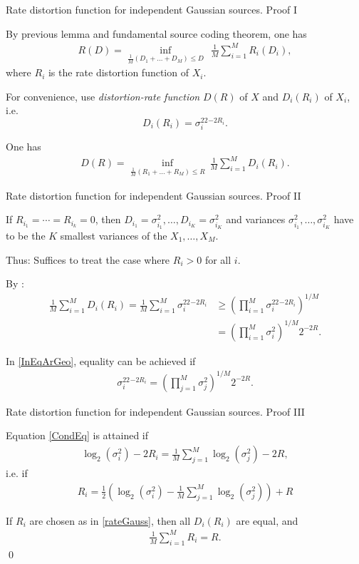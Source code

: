 \begin{frame}{Rate distortion function for independent Gaussian sources. Proof I}
\bit
\item By previous lemma and fundamental source coding theorem, one has
\begin{align*}
R(D)=\inf_{\frac{1}{M}(D_1+\dots+D_M)\leq D}\:\:\frac{1}{M}\sum_{i=1}^MR_i(D_i),
\end{align*}
where $R_i$ is the rate distortion function of $X_i$. 
\item For convenience, use \textit{distortion-rate function} $D(R)$ of $X$ and $D_i(R_i)$ of $X_i$, i.e. 
\[
D_i(R_i)=\sigma_i^22^{-2R_i}. 
\]
\item One has 
\begin{align*}
D(R)=\inf_{\frac{1}{M}(R_1+\dots+R_M)\leq R}\:\frac{1}{M}\sum_{i=1}^MD_i(R_i). 
\end{align*}
\eit
\end{frame}

\begin{frame}{Rate distortion function for independent Gaussian sources. Proof II}
\bit
\item If $R_{i_1}=\cdots=R_{i_k}=0$, then
$D_{i_1}=\sigma_{i_1}^2,\dots, D_{i_K}=\sigma_{i_K}^2$ and
variances $\sigma_{i_1}^2,\dots,\sigma_{i_K}^2$ have to be the $K$ smallest variances of the $X_1,\dots,X_M$.
\item Thus: Suffices to treat the case where $R_i>0$ for all $i$. 
\item By :  
\begin{align}\label{InEqArGeo}
\frac{1}{M}\sum_{i=1}^MD_i(R_i) =  \frac{1}{M} \sum_{i=1}	^M\sigma_i^22^{-2R_i} 
&\geq (\prod_{i=1}^M\sigma_i^22^{-2R_i})^{1/M}\nonumber
\\&=(\prod_{i=1}^M\sigma_i^2)^{1/M}2^{-2R}.
\end{align}
\item In \eqref{InEqArGeo}, equality can be achieved if  
\begin{align}\label{CondEq}
\sigma_i^22^{-2R_i}=(\prod_{j=1}^M\sigma_j^2)^{1/M}2^{-2R}.
\end{align}
\eit
\end{frame}

\begin{frame}{Rate distortion function for independent Gaussian sources. Proof III}
\bit
\item Equation \eqref{CondEq} is attained if 
\begin{align*}
\log_2(\sigma_i^2)-2R_i=\frac{1}{M}\sum_{j=1}^M\log_2(\sigma_j^2)-2R,
\end{align*}
i.e. if 
\begin{align}\label{rateGauss}
R_i=\frac{1}{2}\left(\log_2(\sigma_i^2)-\frac{1}{M}\sum_{j=1}^M\log_2(\sigma_j^2)\right)+R
\end{align}
\item If $R_i$ are chosen as in \eqref{rateGauss}, then all $D_i(R_i)$ are equal, and 
\begin{align*}
\frac{1}{M}\sum_{i=1}^MR_i=R.
\end{align*}
 \qed
\eit
\end{frame}


